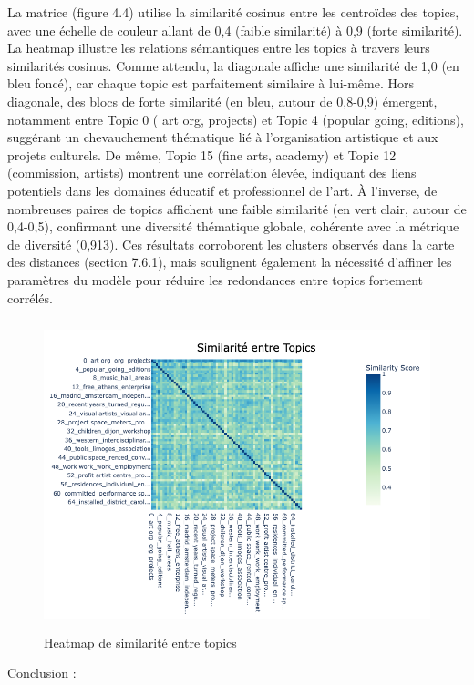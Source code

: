 \documentclass[mstat,12pt]{unswthesis}
\begin{document}
La matrice (figure 4.4) utilise la similarité cosinus entre les centroïdes des topics, avec une 
échelle de couleur allant de 0,4 (faible similarité) à 0,9 (forte similarité). 
La heatmap illustre les relations sémantiques entre les topics à travers leurs similarités 
cosinus. Comme attendu, la diagonale affiche une similarité de 1,0 (en bleu foncé), car chaque 
topic est parfaitement similaire à lui-même. Hors diagonale, des blocs de forte similarité (en 
bleu, autour de 0,8-0,9) émergent, notamment entre Topic 0 ( art org, projects) et Topic 4 
(popular going, editions), suggérant un chevauchement thématique lié à l’organisation 
artistique et aux projets culturels. De même, Topic 15 (fine arts, academy) et Topic 12 
(commission, artists) montrent une corrélation élevée, indiquant des liens potentiels dans les 
domaines éducatif et professionnel de l’art. À l’inverse, de nombreuses paires de topics 
affichent une faible similarité (en vert clair, autour de 0,4-0,5), confirmant une diversité 
thématique globale, cohérente avec la métrique de diversité (0,913). Ces résultats corroborent 
les clusters observés dans la carte des distances (section 7.6.1), mais soulignent également la 
nécessité d’affiner les paramètres du modèle pour réduire les redondances entre topics 
fortement corrélés.


\begin{figure}[H]
    \centering
    \includegraphics[width=16cm,height=9cm]{Heatmap.png}
    \caption{Heatmap de similarité entre topics}
    \label{fig:enquete}
\end{figure}

\bigskip

Conclusion :  
\end{document}
